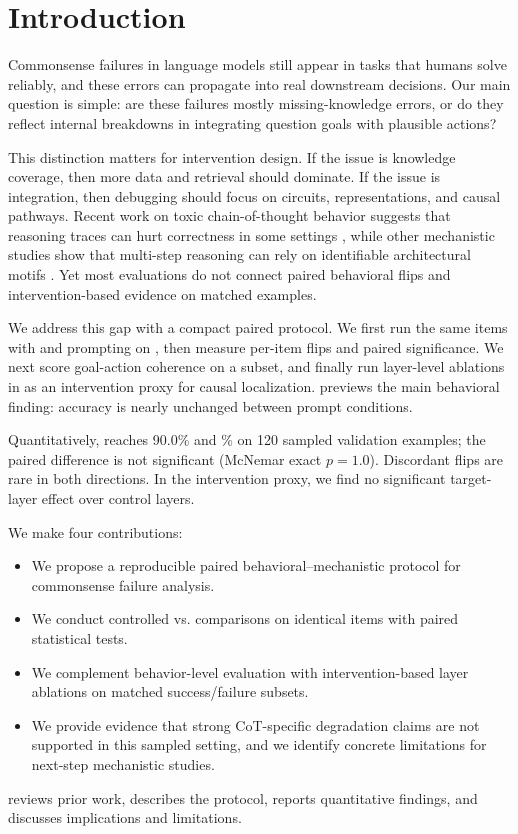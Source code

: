 \section{Introduction}
\label{sec:introduction}

Commonsense failures in language models still appear in tasks that humans solve reliably, and these errors can propagate into real downstream decisions. Our main question is simple: are these failures mostly missing-knowledge errors, or do they reflect internal breakdowns in integrating question goals with plausible actions?

This distinction matters for intervention design. If the issue is knowledge coverage, then more data and retrieval should dominate. If the issue is integration, then debugging should focus on circuits, representations, and causal pathways. Recent work on toxic chain-of-thought behavior suggests that reasoning traces can hurt correctness in some settings \citep{li2024focus}, while other mechanistic studies show that multi-step reasoning can rely on identifiable architectural motifs \citep{hou2023towards,cabannes2024iteration}. Yet most evaluations do not connect paired behavioral flips and intervention-based evidence on matched examples.

We address this gap with a compact paired protocol. We first run the same \csqa items with \direct and \cotprompt prompting on \gptapi, then measure per-item flips and paired significance. We next score goal-action coherence on a subset, and finally run layer-level ablations in \proxy as an intervention proxy for causal localization.  previews the main behavioral finding: accuracy is nearly unchanged between prompt conditions.

Quantitatively, \direct reaches 90.0\% and \% on 120 sampled \csqa validation examples; the paired difference is not significant (McNemar exact $p=1.0$). Discordant flips are rare in both directions. In the intervention proxy, we find no significant target-layer effect over control layers.

We make four contributions:
\begin{itemize}
    \setlength{\itemsep}{0pt}
    \setlength{\topsep}{0pt}
    \item We propose a reproducible paired behavioral--mechanistic protocol for commonsense failure analysis.
    \item We conduct controlled \direct vs. \cotprompt comparisons on identical items with paired statistical tests.
    \item We complement behavior-level evaluation with intervention-based layer ablations on matched success/failure subsets.
    \item We provide evidence that strong CoT-specific degradation claims are not supported in this sampled setting, and we identify concrete limitations for next-step mechanistic studies.
\end{itemize}

  reviews prior work,  describes the protocol,  reports quantitative findings, and  discusses implications and limitations.
